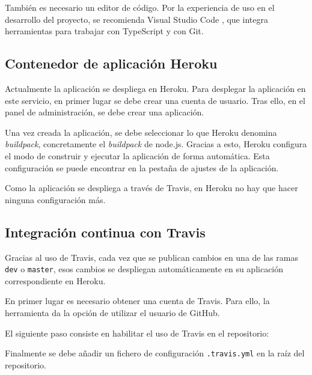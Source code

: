 
También es necesario un editor de código. Por la experiencia de uso en el desarrollo del proyecto, se recomienda Visual Studio Code \cite{vscode}, que integra herramientas para trabajar con TypeScript y con Git.


\subsection{Contenedor de aplicación Heroku}

Actualmente la aplicación se despliega en Heroku. Para desplegar la aplicación en este servicio, en primer lugar se debe crear una cuenta de usuario. Tras ello, en el panel de administración, se debe crear una aplicación.


Una vez creada la aplicación, se debe seleccionar lo que Heroku denomina \textit{buildpack}, concretamente el \textit{buildpack} de node.js. Gracias a esto, Heroku configura el modo de construir y ejecutar la aplicación de forma automática. Esta configuración se puede encontrar en la pestaña de ajustes de la aplicación.


Como la aplicación se despliega a través de Travis, en Heroku no hay que hacer ninguna configuración más.

\subsection{Integración continua con Travis}

Gracias al uso de Travis, cada vez que se publican cambios en una de las ramas \texttt{dev} o \texttt{master}, esos cambios se despliegan automáticamente en su aplicación correspondiente en Heroku.

En primer lugar es necesario obtener una cuenta de Travis. Para ello, la herramienta da la opción de utilizar el usuario de GitHub.

El siguiente paso consiste en habilitar el uso de Travis en el repositorio:


Finalmente se debe añadir un fichero de configuración \texttt{.travis.yml} en la raíz del repositorio.

